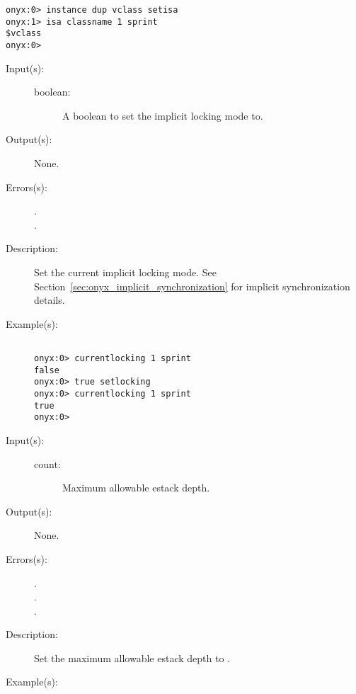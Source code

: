 \begin{description}
\begin{description}
\begin{verbatim}
onyx:0> instance dup vclass setisa
onyx:1> isa classname 1 sprint
$vclass
onyx:0>
		\end{verbatim}
	\end{description}
\label{systemdict:setlocking}
\item[{\onyxop{boolean}{setlocking}{--}}: ]
	\begin{description}\item[]
	\item[Input(s): ]
		\begin{description}\item[]
		\item[boolean: ]
			A boolean to set the implicit locking mode to.
		\end{description}
	\item[Output(s): ] None.
	\item[Errors(s): ]
		\begin{description}\item[]
		\item[.]
		\item[.]
		\end{description}
	\item[Description: ]
		Set the current implicit locking mode.  See
		Section~\ref{sec:onyx_implicit_synchronization} for implicit
		synchronization details.
	\item[Example(s): ]\begin{verbatim}

onyx:0> currentlocking 1 sprint
false
onyx:0> true setlocking
onyx:0> currentlocking 1 sprint
true
onyx:0>
		\end{verbatim}
	\end{description}
\label{systemdict:setmaxestack}
\item[{\onyxop{count}{setmaxestack}{--}}: ]
	\begin{description}\item[]
	\item[Input(s): ]
		\begin{description}\item[]
		\item[count: ]
			Maximum allowable estack depth.
		\end{description}
	\item[Output(s): ] None.
	\item[Errors(s): ]
		\begin{description}\item[]
		\item[.]
		\item[.]
		\item[.]
		\end{description}
	\item[Description: ]
		Set the maximum allowable estack depth to .
	\item[Example(s): ]\begin{verbatim}


\end{verbatim}
\end{description}
\end{description}
